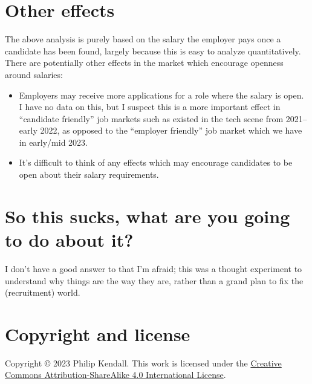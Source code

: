 \documentclass[a4paper]{article}
\begin{document}
\section{Other effects}

The above analysis is purely based on the salary the employer pays once a candidate has been found, largely because this is easy to analyze quantitatively. There are potentially other effects in the market which encourage openness around salaries:

\begin{itemize}
\item Employers may receive more applications for a role where the salary is open. I have no data on this, but I suspect this is a more important effect in ``candidate friendly'' job markets such as existed in the tech scene from 2021--early 2022, as opposed to the ``employer friendly'' job market which we have in early/mid 2023.
\item It's difficult to think of any effects which may encourage candidates to be open about their salary requirements.
\end{itemize}

\section{So this sucks, what are you going to do about it?}

I don't have a good answer to that I'm afraid; this was a thought experiment to understand why things are the way they are, rather than a grand plan to fix the (recruitment) world.

\section{Copyright and license}

Copyright \copyright{} 2023 Philip Kendall. This work is licensed under the \href{https://creativecommons.org/licenses/by-sa/4.0/}{Creative Commons Attribution-ShareAlike 4.0 International License}.
\end{document}
